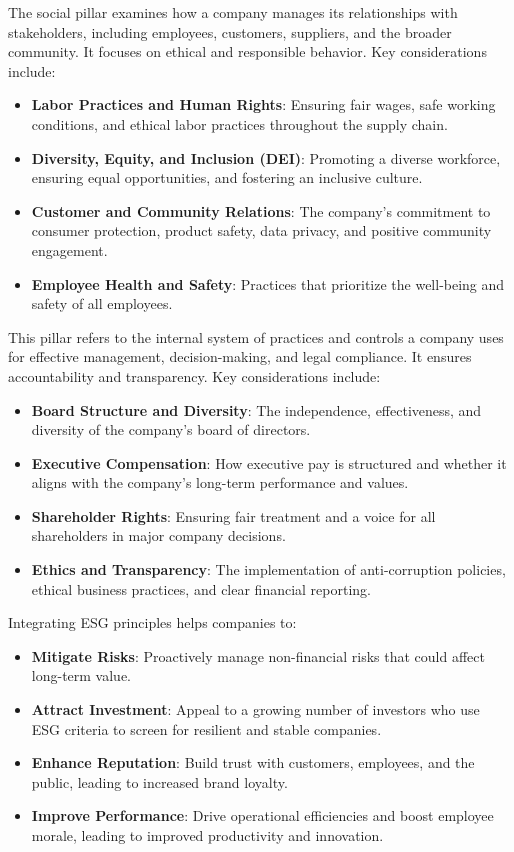 \documentclass{article}
\begin{document}
The social pillar examines how a company manages its relationships with stakeholders, including employees, customers, suppliers, and the broader community. It focuses on ethical and responsible behavior. Key considerations include:

\begin{itemize}
    \item \textbf{Labor Practices and Human Rights}: Ensuring fair wages, safe working conditions, and ethical labor practices throughout the supply chain.
    \item \textbf{Diversity, Equity, and Inclusion (DEI)}: Promoting a diverse workforce, ensuring equal opportunities, and fostering an inclusive culture.
    \item \textbf{Customer and Community Relations}: The company's commitment to consumer protection, product safety, data privacy, and positive community engagement.
    \item \textbf{Employee Health and Safety}: Practices that prioritize the well-being and safety of all employees.
\end{itemize}

This pillar refers to the internal system of practices and controls a company uses for effective management, decision-making, and legal compliance. It ensures accountability and transparency. Key considerations include:

\begin{itemize}
    \item \textbf{Board Structure and Diversity}: The independence, effectiveness, and diversity of the company's board of directors.
    \item \textbf{Executive Compensation}: How executive pay is structured and whether it aligns with the company's long-term performance and values.
    \item \textbf{Shareholder Rights}: Ensuring fair treatment and a voice for all shareholders in major company decisions.
    \item \textbf{Ethics and Transparency}: The implementation of anti-corruption policies, ethical business practices, and clear financial reporting.
\end{itemize}


Integrating ESG principles helps companies to:
\begin{itemize}
    \item \textbf{Mitigate Risks}: Proactively manage non-financial risks that could affect long-term value.
    \item \textbf{Attract Investment}: Appeal to a growing number of investors who use ESG criteria to screen for resilient and stable companies.
    \item \textbf{Enhance Reputation}: Build trust with customers, employees, and the public, leading to increased brand loyalty.
    \item \textbf{Improve Performance}: Drive operational efficiencies and boost employee morale, leading to improved productivity and innovation.
\end{itemize}
\end{document}
